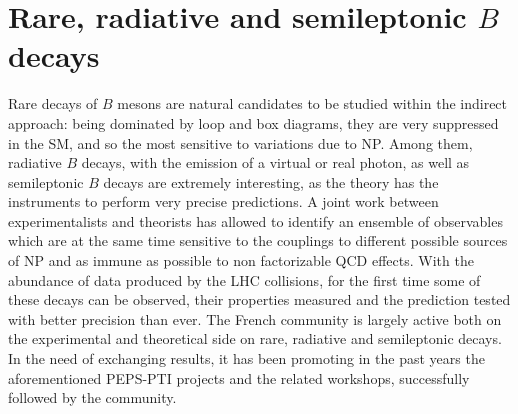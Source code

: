 \section{Rare, radiative and semileptonic $B$ decays}

Rare decays of $B$ mesons are natural candidates to be studied within the indirect approach: being dominated by  loop and box diagrams, they are very suppressed in the SM, and so the most sensitive to variations due to NP.  
Among them, radiative $B$ decays, with the emission of a virtual or real photon, as well as semileptonic $B$ decays are extremely interesting, as the theory has the instruments to perform very precise predictions.  A joint work between experimentalists and theorists has allowed to identify an ensemble of observables which are
at the same time sensitive to the couplings to different possible sources of NP and as immune as possible to non factorizable QCD effects. 
With the abundance of data produced by the LHC collisions, for the first time some of these decays can be observed, their properties measured  and the prediction tested with better precision than ever.  The French community is largely active both on the experimental and theoretical side on rare, radiative and semileptonic decays.  In the need of exchanging results, it has been promoting in the past years the aforementioned PEPS-PTI projects and the related workshops, successfully followed by the community. 


